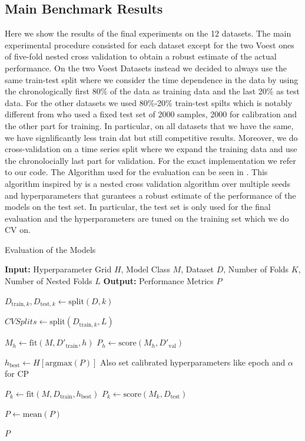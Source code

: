 \subsection{Main Benchmark Results}
Here we show the results of the final experiments on the 12 datasets. The main experimental procedure consisted for each dataset except for the two Voest ones of five-fold nested cross validation to obtain a robust estimate of the actual performance. On the two Voest Datasets instead we decided to always use the same train-test split where we consider the time dependence in the data by using the chronologically first 80\% of the data as training data and the last 20\% as test data. For the other datasets we used 80\%-20\% train-test spilts which is notably different from \cite{sesia2021conformal} who used a fixed test set of 2000 samples, 2000 for calibration and the other part for training. In particular, on all datasets that we have the same, we have signlificantly less train dat but still competitive results.  Moreover, we do cross-validation on a time series split where we expand the training data and use the chronolocially last part for validation. For the exact implementation we refer to our code. The Algorithm used for the evaluation can be seen in . This algorithm inspired by \cite{rothfuss2019noise} is a nested cross validation algorithm over multiple seeds and hyperparameters that gurantees a robust estimate of the performance of the models on the test set. In particular, the test set is only used for the final evaluation and the hyperparameters are tuned on the training set which we do CV on.



\begin{algorithm}
    \caption{Evaluation of the Models}
    \label{alg:evaluation}
    \begin{algorithmic}
        \STATE \textbf{Input:} Hyperparameter Grid $H$, Model Class $M$, Dataset $D$, Number of Folds $K$, Number of Nested Folds $L$
        \STATE \textbf{Output:} Performance Metrics $P$

        \STATE $D_{\text{train}, k}, D_{\text{test}, k} \leftarrow \text{split}(D, k)$

        \STATE $CVSplits \leftarrow \text{split}(D_{\text{train}, k}, L)$

        \STATE $M_h \leftarrow \text{fit}(M, D'_{\text{train}}, h)$
        \STATE $P_h \leftarrow \text{score}(M_h, D'_{\text{val}})$
        \ENDFOR
        \ENDFOR

        \STATE $h_{\text{best}} \leftarrow H[\text{argmax}(P)]$ Also set calibrated hyperparameters like epoch and $\alpha$ for CP

        \STATE $P_k \leftarrow \text{fit}(M, D_{\text{train}}, h_{\text{best}})$
        \STATE $P_k \leftarrow \text{score}(M_k, D_{\text{test}})$
        \ENDFOR

        \STATE $P \leftarrow \text{mean}(P)$

        \RETURN $P$
    \end{algorithmic}
\end{algorithm}

